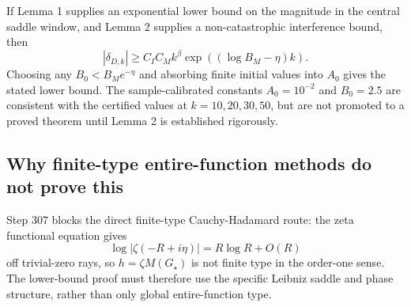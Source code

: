 If Lemma 1 supplies an exponential lower bound on the magnitude in the
central saddle window, and Lemma 2 supplies a non-catastrophic
interference bound, then
\[
  |\delta_{D,k}|
  \ge C_I C_M k^\beta \exp((\log B_M-\eta)k).
\]
Choosing any \(B_0< B_Me^{-\eta}\) and absorbing finite initial values
into \(A_0\) gives the stated lower bound.  The sample-calibrated
constants \(A_0=10^{-2}\) and \(B_0=2.5\) are consistent with the certified
values at \(k=10,20,30,50\), but are not promoted to a proved theorem
until Lemma 2 is established rigorously.

\subsection*{Why finite-type entire-function methods do not prove this}

Step 307 blocks the direct finite-type Cauchy-Hadamard route: the zeta
functional equation gives
\[
  \log|\zeta(-R+i\eta)|=R\log R+O(R)
\]
off trivial-zero rays, so \(h=\zeta M(G_\star)\) is not finite type in the
order-one sense.  The lower-bound proof must therefore use the specific
Leibniz saddle and phase structure, rather than only global
entire-function type.

